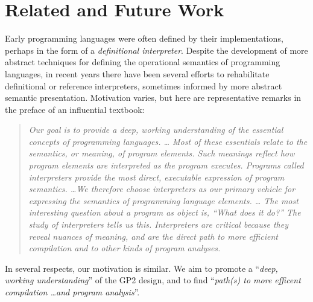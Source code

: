 \section{Related and Future Work}
\label{sec:relatedandfuture}
Early programming languages were often defined by their implementations,
perhaps in the form of a \emph{definitional interpreter}.
Despite the development of more abstract techniques
for defining the operational semantics of programming languages, in recent years there
have been several efforts to rehabilitate definitional or
reference interpreters, sometimes informed by more abstract semantic
presentation.
Motivation varies, but here are representative remarks in the preface
of an influential textbook: 
\begin{quote}
\textit{Our goal is to provide a deep, working understanding of the essential concepts of programming languages. \ldots
Most of these essentials relate to the semantics, or meaning, of program elements. Such meanings reflect how program elements are interpreted as the program executes. Programs called interpreters provide the most direct, executable expression of program semantics. \ldots We therefore choose interpreters as our primary vehicle for expressing the semantics of programming language elements. \ldots
The most interesting question about a program as object is, \textnormal{``What does it do?''} The study of interpreters tells us this. Interpreters are critical because they reveal nuances of meaning, and are the direct path to more efficient compilation and to other kinds of program analyses.} \cite{Friedmanetal2008}
\end{quote}
In several respects, our motivation is similar.  We aim to promote a ``\textit{deep, working understanding}'' of the GP2 design, and to find ``\textit{path(s) to more efficent compilation \ldots and program analysis}''.

